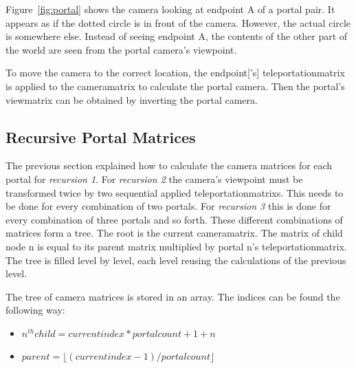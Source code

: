 Figure~\ref{fig:portal} shows the camera looking at endpoint A of a portal pair. It appears as if the dotted circle is in front of the camera. However, the actual circle is somewhere else. Instead of seeing endpoint A, the contents of the other part of the world are seen from the portal camera's viewpoint.


To move the camera to the correct location, the \gls{endpoint}['s] \gls{teleportationmatrix} is applied to the \gls{cameramatrix} to calculate the portal camera. Then the portal's \gls{viewmatrix} can be obtained by inverting the portal camera.






\subsection{Recursive Portal Matrices}
\label{section:recursivecameramatrices}
The previous section explained how to calculate the camera matrices for each portal for \textit{recursion 1}. For \textit{recursion 2} the camera's viewpoint must be transformed twice by two sequential applied \glspl{teleportationmatrix}. This needs to be done for every combination of two portals. For \textit{recursion 3} this is done for every combination of three portals and so forth. These different combinations of matrices form a tree. The root is the current \gls{cameramatrix}. The matrix of child node n is equal to its parent matrix multiplied by portal n's \gls{teleportationmatrix}. The tree is filled level by level, each level reusing the calculations of the previous level.




The tree of camera matrices is stored in an array. The indices can be found the following way:

\begin{itemize}
	\item $ n^{th} child = current index * portalcount + 1 + n$
	\item $ parent = \lfloor(current index-1)/portal count\rfloor $
\end{itemize}



